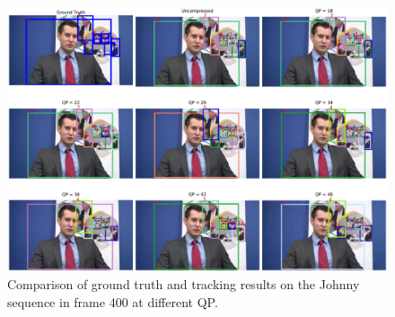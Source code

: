 \begin{figure}[!tb]
  \centering
  \includegraphics[width=1.0\linewidth]{img/Johnny_0_frame400.pdf}
  \caption[Comparison of ground truth and tracking results on the Johnny sequence in frame 400 at different QP]
  {
  Comparison of ground truth and tracking results on the Johnny sequence in frame 400 at different QP.
  }
  \label{fig:Johnny_0_frame400}
\end{figure}